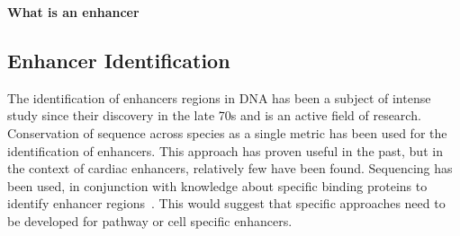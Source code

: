
        


	
        \textbf{What is an enhancer}
        


        
        \subsection{Enhancer Identification}
        
        The identification of enhancers regions in DNA has been a subject of intense study since their discovery in the late 70s and is an active field of research.
        Conservation of sequence across species as a single metric has been used for the identification of enhancers. This approach has proven useful in the past, but in the context of cardiac enhancers, relatively few have been found. Sequencing has been used, in conjunction with knowledge about specific binding proteins to identify enhancer regions~\cite{blow2010chip}. This would suggest that specific approaches need to be developed for pathway or cell specific enhancers. 
        
